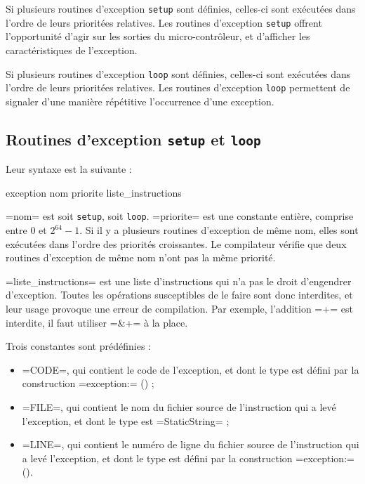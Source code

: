 Si plusieurs routines d'exception \texttt{setup} sont définies, celles-ci sont exécutées dans l'ordre de leurs prioritées relatives. Les routines d'exception \texttt{setup} offrent l'opportunité d'agir sur les sorties du micro-contrôleur, et d'afficher les caractéristiques de l'exception.

Si plusieurs routines d'exception \texttt{loop} sont définies, celles-ci sont exécutées dans l'ordre de leurs prioritées relatives. Les routines d'exception \texttt{loop} permettent de signaler d'une manière répétitive l'occurrence d'une exception.

\subsection{Routines d'exception \texttt{setup} et \texttt{loop}}

Leur syntaxe est la suivante :
\begin{PLM}
exception nom priorite {
  liste_instructions
}
\end{PLM}

\plm=nom= est soit \texttt{setup}, soit \texttt{loop}. \plm=priorite= est une constante entière, comprise entre $0$ et $2^{64}-1$. Si il y a plusieurs routines d'exception de même nom, elles sont exécutées dans l'ordre des priorités croissantes. Le compilateur vérifie que deux routines d'exception de même nom n'ont pas la même priorité.

\plm=liste_instructions= est une liste d'instructions qui n'a pas le droit d'engendrer d'exception. Toutes les opérations susceptibles de le faire sont donc interdites, et leur usage provoque une erreur de compilation. Par exemple, l'addition \plm=+= est interdite, il faut utiliser \plm=&+= à la place.

Trois constantes sont prédéfinies :
\begin{itemize}
  \item \plm=CODE=, qui contient le code de l'exception, et dont le type est défini par la construction \plm=exception:= () ;
  \item \plm=FILE=, qui contient le nom du fichier source de l'instruction qui a levé l'exception, et dont le type est \plm=StaticString= ;
  \item \plm=LINE=, qui contient le numéro de ligne du fichier source de l'instruction qui a levé l'exception, et dont le type est défini par la construction \plm=exception:= ().
\end{itemize}

